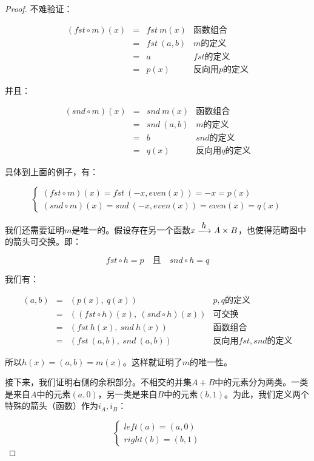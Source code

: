 \documentclass{article}
\begin{document}
\begin{proof}
不难验证：

\[
\begin{array}{rcll}
(fst \circ m)(x) & = & fst\ m(x) & \text{函数组合} \\
                 & = & fst\ (a, b) & \text{$m$的定义} \\
                 & = & a & \text{$fst$的定义} \\
                 & = & p(x) & \text{反向用$p$的定义}
\end{array}
\]

并且：

\[
\begin{array}{rcll}
(snd \circ m)(x) & = & snd\ m(x) & \text{函数组合} \\
                 & = & snd\ (a, b) & \text{$m$的定义} \\
                 & = & b & \text{$snd$的定义} \\
                 & = & q(x) & \text{反向用$q$的定义}
\end{array}
\]

具体到上面的例子，有：

\[
\begin{cases}
(fst \circ m)(x) = fst\ (-x, even(x)) = -x = p(x) \\
(snd \circ m)(x) = snd\ (-x, even(x)) = even(x) = q(x)
\end{cases}
\]

我们还需要证明$m$是唯一的。假设存在另一个函数$x \arrowto{h} A \times B$，也使得范畴图中的箭头可交换。即：

\[
fst \circ h = p \quad \text{且} \quad snd \circ h = q
\]

我们有：

\[
\begin{array}{rcll}
(a, b) & = & (p(x),\ q(x)) & \text{$p, q$的定义} \\
       & = & ((fst \circ h)(x),\ (snd \circ h)(x)) & \text{可交换} \\
       & = & (fst\ h(x),\ snd\ h(x)) & \text{函数组合} \\
       & = & (fst\ (a, b),\ snd\ (a, b)) & \text{反向用$fst, snd$的定义}
\end{array}
\]

所以$h(x) = (a, b) = m(x)$。这样就证明了$m$的唯一性。

接下来，我们证明右侧的余积部分。不相交的并集$A+B$中的元素分为两类。一类是来自$A$中的元素$(a, 0)$，另一类是来自$B$中的元素$(b, 1)$。为此，我们定义两个特殊的箭头（函数）作为$i_A, i_B$：

\[
\begin{cases}
left(a) = (a, 0) \\
right(b) = (b, 1)
\end{cases}
\]


\end{proof}
\end{document}
